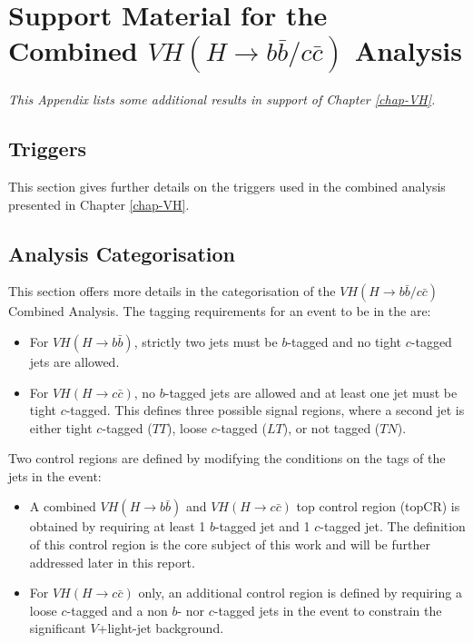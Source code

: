 \chapter{Support Material for the Combined $VH(H\rightarrow b\bar{b}/c\bar{c})$ Analysis}
\textit{This Appendix lists some additional results in support of Chapter \ref{chap-VH}.}

\section{Triggers}\label{appsec-trigger}
This section gives further details on the triggers used in the combined analysis presented in Chapter \ref{chap-VH}.



\section{Analysis Categorisation}\label{ap-vhCat}
This section offers more details in the categorisation of the $VH(H\rightarrow b\bar{b}/c\bar{c})$ Combined Analysis. The tagging requirements for an event to be in the  are:
\begin{itemize}
\item For $VH(H\rightarrow b\bar{b})$, strictly two jets must be $b$-tagged and no tight $c$-tagged jets are allowed. 
\item For $VH(H\rightarrow c\bar{c})$, no $b$-tagged jets are allowed and at least one jet must be tight $c$-tagged. This defines three possible signal regions, where a second jet is either tight $c$-tagged ($TT$), loose $c$-tagged ($LT$), or not tagged ($TN$). 
\end{itemize}
Two control regions are defined by modifying the conditions on the tags of the jets in the event: 
\begin{itemize}
\item A combined $VH(H\rightarrow b\bar{b})$ and $VH(H\rightarrow c\bar{c})$ top control region (topCR) is obtained by requiring at least 1 $b$-tagged jet and 1 $c$-tagged jet. The definition of this control region is the core subject of this work and will be further addressed later in this report. 
\item For $VH(H\rightarrow c\bar{c})$ only, an additional control region is defined by requiring a loose $c$-tagged and a non $b$- nor $c$-tagged jets in the event to constrain the significant $V$+light-jet background. 
\end{itemize}

